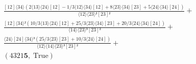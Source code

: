 \documentclass[varwidth, border=5pt]{standalone}
\begin{document}
\begin{my}
$\begin{gathered}
\scriptscriptstyle\frac{[12]⟨34⟩(2⟨13⟩⟨24⟩[12]-1/3⟨12⟩⟨34⟩[12]+8⟨23⟩⟨34⟩[23]+5⟨24⟩⟨34⟩[24])}{⟨12⟩⟨23⟩²[23]²} +\\
\scriptscriptstyle\frac{[12]⟨34⟩²(10/3⟨13⟩⟨24⟩[12]+25/3⟨23⟩⟨34⟩[23]+20/3⟨24⟩⟨34⟩[24])}{⟨14⟩⟨23⟩³[23]²} +\\
\scriptscriptstyle\frac{⟨24⟩[24]⟨34⟩³(25/3⟨23⟩[23]+10/3⟨24⟩[24])}{⟨12⟩⟨14⟩⟨23⟩³[23]²} +\\
\scriptscriptstyle(4321𝟓,\;\text{True}) \phantom{+}
\end{gathered}$
\end{my}
\end{document}
